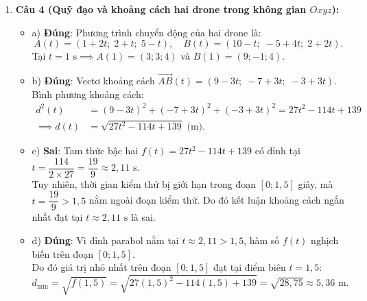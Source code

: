 \documentclass[12pt,a4paper]{article}
\begin{document}
\begin{enumerate}[label=\textbf{Câu \arabic*:}, leftmargin=*]
\item \textbf{Câu 4 (Quỹ đạo và khoảng cách hai drone trong không gian $Oxyz$):}
\begin{itemize}
    \item a) \textbf{Đúng}: Phương trình chuyển động của hai drone là:
    $$A(t) = (1 + 2t;\; 2 + t;\; 5 - t),\quad B(t) = (10 - t;\; -5 + 4t;\; 2 + 2t).$$
    Tại $t = 1\text{ s} \implies A(1) = (3; 3; 4)$ và $B(1) = (9; -1; 4)$.
    \item b) \textbf{Đúng}: Vectơ khoảng cách $\overrightarrow{AB}(t) = (9 - 3t;\; -7 + 3t;\; -3 + 3t)$.\\
    Bình phương khoảng cách:
    $$\begin{aligned}
    d^2(t) &= (9 - 3t)^2 + (-7 + 3t)^2 + (-3 + 3t)^2 = 27t^2 - 114t + 139\\
    \implies d(t) &= \sqrt{27t^2 - 114t + 139}\text{ (m)}.
    \end{aligned}$$
    \item c) \textbf{Sai}: Tam thức bậc hai $f(t) = 27t^2 - 114t + 139$ có đỉnh tại $t = \dfrac{114}{2 \times 27} = \dfrac{19}{9} \approx 2{,}11\text{ s}$.\\
    Tuy nhiên, thời gian kiểm thử bị giới hạn trong đoạn $[0; 1{,}5]$ giây, mà $t = \dfrac{19}{9} > 1{,}5$ nằm ngoài đoạn kiểm thử. Do đó kết luận khoảng cách ngắn nhất đạt tại $t \approx 2{,}11\text{ s}$ là sai.
    \item d) \textbf{Đúng}: Vì đỉnh parabol nằm tại $t \approx 2{,}11 > 1{,}5$, hàm số $f(t)$ nghịch biến trên đoạn $[0; 1{,}5]$.\\
    Do đó giá trị nhỏ nhất trên đoạn $[0; 1{,}5]$ đạt tại điểm biên $t = 1{,}5$:
    $$d_{\min} = \sqrt{f(1{,}5)} = \sqrt{27(1{,}5)^2 - 114(1{,}5) + 139} = \sqrt{28{,}75} \approx 5{,}36\text{ m}.$$
\end{itemize}

\end{enumerate}
\end{document}

